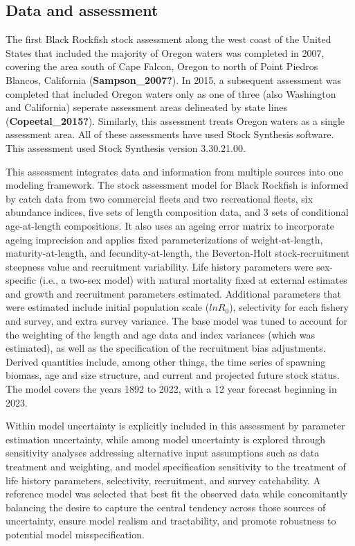 \documentclass[11pt,
  english,
  letterpaper,
]{article}
\begin{document}
\clearpage

\hypertarget{data-and-assessment}{%
\subsection*{Data and assessment}\label{data-and-assessment}}

The first Black Rockfish stock assessment along the west coast of the United States that included the majority of Oregon waters was completed in 2007, covering the area south of Cape Falcon, Oregon to north of Point Piedros Blancos, California (\textbf{Sampson\_2007?}). In 2015, a subsequent assessment was completed that included Oregon waters only as one of three (also Washington and California) seperate assessment areas delineated by state lines (\textbf{Copeetal\_2015?}). Similarly, this assessment treats Oregon waters as a single assessment area. All of these assessments have used Stock Synthesis software. This assessment used Stock Synthesis version 3.30.21.00.

This assessment integrates data and information from multiple sources into one modeling framework. The stock assessment model for Black Rockfish is informed by catch data from two commercial fleets and two recreational fleets, six abundance indices, five sets of length composition data, and 3 sets of conditional age-at-length compositions. It also uses an ageing error matrix to incorporate ageing imprecision and applies fixed parameterizations of weight-at-length, maturity-at-length, and fecundity-at-length, the Beverton-Holt stock-recruitment steepness value and recruitment variability. Life history parameters were sex-specific (i.e., a two-sex model) with natural mortality fixed at external estimates and growth and recruitment parameters estimated. Additional parameters that were estimated include initial population scale (\(lnR_0\)), selectivity for each fishery and survey, and extra survey variance. The base model was tuned to account for the weighting of the length and age data and index variances (which was estimated), as well as the specification of the recruitment bias adjustments. Derived quantities include, among other things, the time series of spawning biomass, age and size structure, and current and projected future stock status. The model covers the years 1892 to 2022, with a 12 year forecast beginning in 2023.

Within model uncertainty is explicitly included in this assessment by parameter estimation uncertainty, while among model uncertainty is explored through sensitivity analyses addressing alternative input assumptions such as data treatment and weighting, and model specification sensitivity to the treatment of life history parameters, selectivity, recruitment, and survey catchability. A reference model was selected that best fit the observed data while concomitantly balancing the desire to capture the central tendency across those sources of uncertainty, ensure model realism and tractability, and promote robustness to potential model misspecification.
\end{document}
